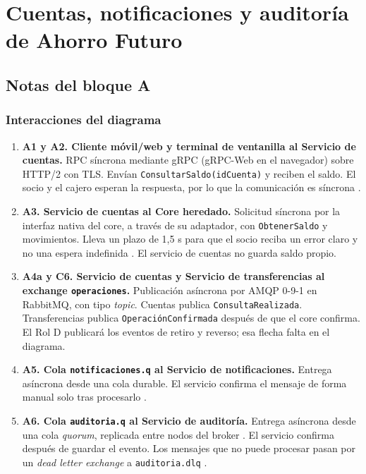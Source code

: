 \documentclass[12pt,a4paper]{article}
\begin{document}
\section{Cuentas, notificaciones y auditoría de Ahorro Futuro}

\subsection{Notas del bloque A}

\subsubsection{Interacciones del diagrama}

\begin{enumerate}
    \item \textbf{A1 y A2. Cliente móvil/web y terminal de ventanilla al Servicio de cuentas.}
    RPC síncrona mediante gRPC (gRPC-Web en el navegador) sobre HTTP/2 con TLS. Envían \texttt{ConsultarSaldo(idCuenta)} y reciben el saldo. El socio y el cajero esperan la respuesta, por lo que la comunicación es síncrona \cite{birrell1984}.

    \item \textbf{A3. Servicio de cuentas al Core heredado.}
    Solicitud síncrona por la interfaz nativa del core, a través de su adaptador, con \texttt{ObtenerSaldo} y movimientos. Lleva un plazo de 1,5 s para que el socio reciba un error claro y no una espera indefinida \cite{grpcdeadlines}. El servicio de cuentas no guarda saldo propio.

    \item \textbf{A4a y C6. Servicio de cuentas y Servicio de transferencias al exchange \texttt{operaciones}.}
    Publicación asíncrona por AMQP 0-9-1 en RabbitMQ, con tipo \textit{topic}. Cuentas publica \texttt{ConsultaRealizada}. Transferencias publica \texttt{OperaciónConfirmada} después de que el core confirma. El Rol D publicará los eventos de retiro y reverso; esa flecha falta en el diagrama.

    \item \textbf{A5. Cola \texttt{notificaciones.q} al Servicio de notificaciones.}
    Entrega asíncrona desde una cola durable. El servicio confirma el mensaje de forma manual solo tras procesarlo \cite{rabbitmqconfirms}.

    \item \textbf{A6. Cola \texttt{auditoria.q} al Servicio de auditoría.}
    Entrega asíncrona desde una cola \textit{quorum}, replicada entre nodos del broker \cite{rabbitmqquorum}. El servicio confirma después de guardar el evento. Los mensajes que no puede procesar pasan por un \textit{dead letter exchange} a \texttt{auditoria.dlq} \cite{rabbitmqdlx}.


\end{enumerate}
\end{document}
